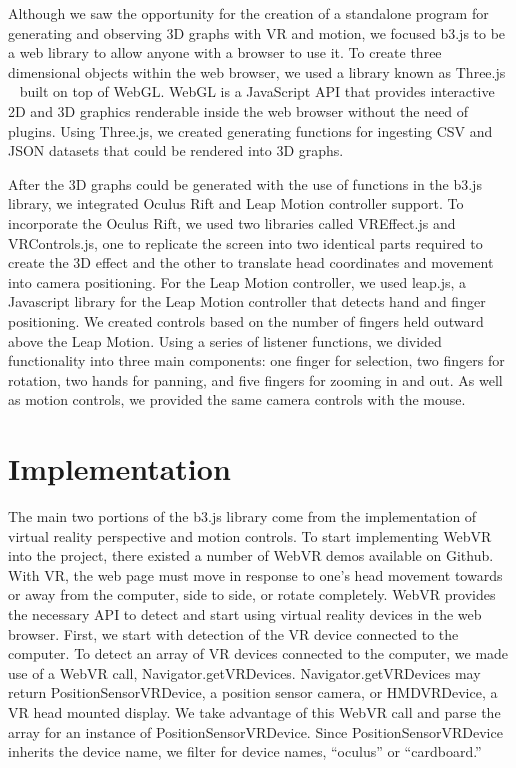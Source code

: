 \documentclass{vgtc}                          %
\begin{document}
Although we saw the opportunity for the creation of a standalone program for generating and observing 3D graphs with VR and motion, we focused b3.js to be a web library to allow anyone with a browser to use it. To create three dimensional objects within the web browser, we used a library known as Three.js ~\cite{cabello2010three} built on top of WebGL. WebGL is a JavaScript API that provides interactive 2D and 3D graphics renderable inside the web browser without the need of plugins. Using Three.js, we created generating functions for ingesting CSV and JSON datasets that could be rendered into 3D graphs.

After the 3D graphs could be generated with the use of functions in the b3.js library, we integrated Oculus Rift and Leap Motion controller support. To incorporate the Oculus Rift, we used two libraries called VREffect.js and VRControls.js, one to replicate the screen into two identical parts required to create the 3D effect and the other to translate head coordinates and movement into camera positioning. For the Leap Motion controller, we used leap.js, a Javascript library for the Leap Motion controller that detects hand and finger positioning. We created controls based on the number of fingers held outward above the Leap Motion. Using a series of listener functions, we divided functionality into three main components: one finger for selection, two fingers for rotation,  two hands for panning, and five fingers for zooming in and out. As well as motion controls, we provided the same camera controls with the mouse.

\section{Implementation}
The main two portions of the b3.js library come from the implementation of virtual reality perspective and motion controls. To start implementing WebVR into the project, there existed a number of WebVR demos available on Github. With VR, the web page must move in response to one’s head movement towards or away from the computer, side to side, or rotate completely. WebVR provides the necessary API to detect and start using virtual reality devices in the web browser. First, we start with detection of the VR device connected to the computer. To detect an array of VR devices connected to the computer, we made use of a WebVR call, Navigator.getVRDevices. Navigator.getVRDevices may return PositionSensorVRDevice, a position sensor camera, or HMDVRDevice, a VR head mounted display. We take advantage of this WebVR call and parse the array for an instance of PositionSensorVRDevice. Since PositionSensorVRDevice inherits the device name, we filter for device names, “oculus” or “cardboard.” 
\end{document}
